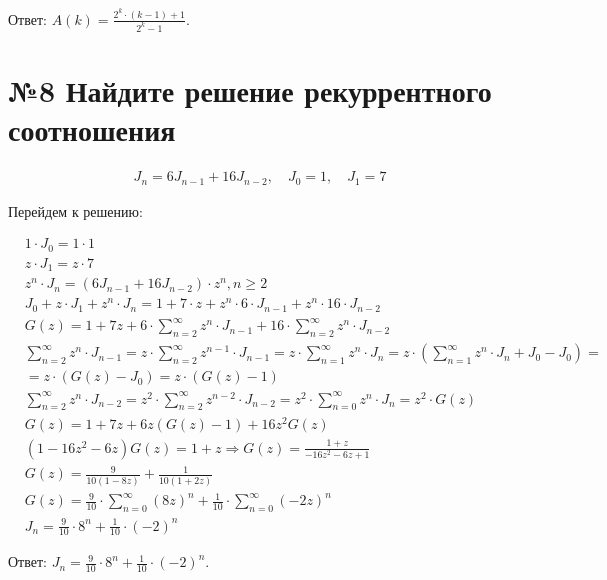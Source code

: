 \documentclass[a4paper,12pt,numbers=noenddot]{scrreprt}
\begin{document}
\begin{flushleft}
Ответ: $A(k) = \frac{2^k \cdot (k-1) + 1}{2^k-1}$.
\end{flushleft}

\section{№8  Найдите решение рекуррентного соотношения}

\begin{align}
    J_n = 6J_{n-1}+16J_{n-2}, \quad J_0=1, \quad J_1 = 7
\end{align}

\begin{flushleft}
Перейдем к решению:
\end{flushleft}

\begin{align}
& 1 \cdot J_0 = 1 \cdot 1 \\&
z \cdot J_1 = z \cdot 7 \\&
z^n \cdot J_n = (6J_{n-1}+16J_{n-2}) \cdot z^n, n \geq 2\\&
J_0 + z \cdot J_1 + z^n \cdot J_n = 1 + 7 \cdot z + z^n \cdot 6 \cdot J_{n-1} + z^n \cdot 16 \cdot J_{n-2} \\&
G(z) = 1 + 7z +6 \cdot \sum_{n=2}^{\infty} z^n \cdot J_{n-1} + 16  \cdot \sum_{n=2}^{\infty} z^n \cdot J_{n-2} \\&
\sum_{n=2}^{\infty} z^n \cdot J_{n-1} = z \cdot \sum_{n=2}^{\infty} z^{n-1} \cdot J_{n-1} = z \cdot \sum_{n=1}^{\infty} z^n \cdot J_n = z \cdot (\sum_{n=1}^{\infty} z^n \cdot J_n + J_0 - J_0) = \\&
 = z \cdot (G(z) - J_0) = z \cdot (G(z) - 1) \\&
\sum_{n=2}^{\infty} z^n \cdot J_{n-2} = z^2 \cdot \sum_{n=2}^{\infty} z^{n-2} \cdot J_{n-2} = z^2 \cdot \sum_{n=0}^{\infty} z^{n} \cdot J_{n} = z^2 \cdot G(z) \\&
G(z)= 1 + 7z + 6z(G(z)-1)+16z^2G(z) \\&
(1-16z^2-6z)G(z)=1+z \Rightarrow G(z) = \frac{1+z}{-16z^2-6z+1} \\&
G(z) = \frac{9}{10(1-8z)} + \frac{1}{10(1+2z)} \\&
G(z)= \frac{9}{10} \cdot \sum_{n=0}^{\infty} (8z)^n + \frac{1}{10} \cdot \sum_{n=0}^{\infty} (-2z)^n \\&
J_n=\frac{9}{10} \cdot 8^n + \frac{1}{10} \cdot (-2)^n
\end{align}

\begin{flushleft}
Ответ: $J_n=\frac{9}{10} \cdot 8^n + \frac{1}{10} \cdot (-2)^n$.
\end{flushleft}
\end{document}
